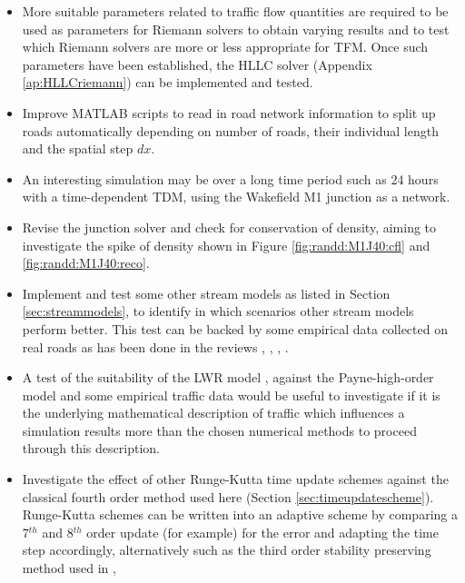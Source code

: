 	\begin{itemize}
		\item More suitable parameters related to traffic flow quantities are required to be used as parameters for Riemann solvers to obtain varying results and to test which Riemann solvers are more or less appropriate for TFM. Once such parameters have been established, the HLLC solver (Appendix \ref{ap:HLLCriemann}) can be implemented and tested. 
		\item Improve MATLAB scripts to read in road network information to split up roads automatically depending on number of roads, their individual length and the spatial step $dx$.
		\item An interesting simulation may be over a long time period such as 24 hours with a time-dependent TDM, using the Wakefield M1 junction as a network.
		\item Revise the junction solver and check for conservation of density, aiming to investigate the spike of density shown in Figure \ref{fig:randd:M1J40:cfl} and \ref {fig:randd:M1J40:reco}.
		\item Implement and test some other stream models as listed in Section \ref{sec:streammodels}, to identify in which scenarios other stream models perform better. This test can be backed by some empirical data collected on real roads as has been done in the reviews \cite{ArdekaniGhandehariNepal11}, \cite{TiwariMarsani14}, \cite{LuMeng13}, \cite{Tom14}.
		\item A test of the suitability of the LWR model \cite{Lighthill55},\cite{Richards56} against the Payne-high-order model \cite{Payne71} and some empirical traffic data would be useful to investigate if it is the underlying mathematical description of traffic which influences a simulation results more than the chosen numerical methods to proceed through this description.
		\item Investigate the effect of other Runge-Kutta time update schemes against the classical fourth order method used here (Section \ref{sec:timeupdatescheme}). Runge-Kutta schemes can be written into an adaptive scheme by comparing a 7$^{th}$ and 8$^{th}$ order update (for example) for the error and adapting the time step accordingly, alternatively such as the third order stability preserving method used in \cite{ShiGuo16}, 
	\end{itemize}
